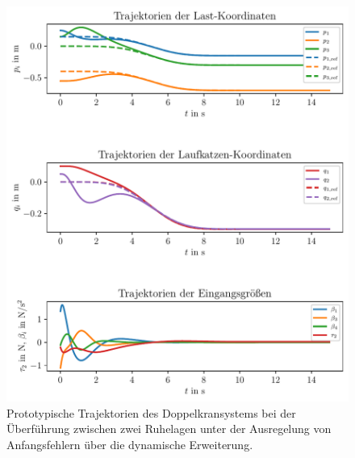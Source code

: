 \begin{figure}[H]
	\begin{center}
		\includegraphics[scale=1]{Pictures/dyn_controller_initial_error}
	\end{center}
	\caption[Trajektorien Ruhelagenüberführung mit Regelung über dynamische Erweiterung]
	{Prototypische Trajektorien des Doppelkransystems bei der Überführung zwischen zwei Ruhelagen unter der Ausregelung von Anfangsfehlern über die dynamische Erweiterung.}
	\label{fig_dyn_controller_initial_error}
\end{figure}

